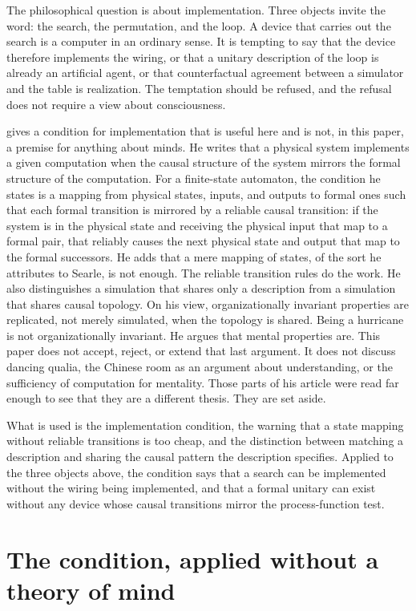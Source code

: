 \documentclass[11pt]{article}
\begin{document}
The philosophical question is about implementation. Three objects invite the word: the search, the permutation, and the loop. A device that carries out the search is a computer in an ordinary sense. It is tempting to say that the device therefore implements the wiring, or that a unitary description of the loop is already an artificial agent, or that counterfactual agreement between a simulator and the table is realization. The temptation should be refused, and the refusal does not require a view about consciousness.

\citet{chalmers1994} gives a condition for implementation that is useful here and is not, in this paper, a premise for anything about minds. He writes that a physical system implements a given computation when the causal structure of the system mirrors the formal structure of the computation. For a finite-state automaton, the condition he states is a mapping from physical states, inputs, and outputs to formal ones such that each formal transition is mirrored by a reliable causal transition: if the system is in the physical state and receiving the physical input that map to a formal pair, that reliably causes the next physical state and output that map to the formal successors. He adds that a mere mapping of states, of the sort he attributes to Searle, is not enough. The reliable transition rules do the work. He also distinguishes a simulation that shares only a description from a simulation that shares causal topology. On his view, organizationally invariant properties are replicated, not merely simulated, when the topology is shared. Being a hurricane is not organizationally invariant. He argues that mental properties are. This paper does not accept, reject, or extend that last argument. It does not discuss dancing qualia, the Chinese room as an argument about understanding, or the sufficiency of computation for mentality. Those parts of his article were read far enough to see that they are a different thesis. They are set aside.

What is used is the implementation condition, the warning that a state mapping without reliable transitions is too cheap, and the distinction between matching a description and sharing the causal pattern the description specifies. Applied to the three objects above, the condition says that a search can be implemented without the wiring being implemented, and that a formal unitary can exist without any device whose causal transitions mirror the process-function test.

\section{The condition, applied without a theory of mind}
\label{sec:cond}
\end{document}
